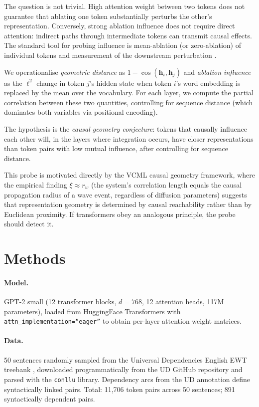 \documentclass[11pt,a4paper]{article}
\begin{document}
The question is not trivial.
High attention weight between two tokens does not guarantee that ablating one
token substantially perturbs the other's representation.
Conversely, strong ablation influence does not require direct attention:
indirect paths through intermediate tokens can transmit causal effects.
The standard tool for probing influence is mean-ablation (or zero-ablation)
of individual tokens and measurement of the downstream perturbation
\cite{vig2020causal,meng2022rome}.

We operationalise \emph{geometric distance} as $1 - \cos(\mathbf{h}_i, \mathbf{h}_j)$
and \emph{ablation influence} as the $\ell^2$ change in token $j$'s
hidden state when token $i$'s word embedding is replaced by the
mean over the vocabulary.
For each layer, we compute the partial correlation between these two
quantities, controlling for sequence distance (which dominates
both variables via positional encoding).

The hypothesis is the \emph{causal geometry conjecture}:
tokens that causally influence each other will, in the layers where
integration occurs, have closer representations than token pairs
with low mutual influence, after controlling for sequence distance.

This probe is motivated directly by the VCML causal geometry framework,
where the empirical finding $\xi \approx r_w$ (the system's correlation
length equals the causal propagation radius of a wave event, regardless
of diffusion parameters) suggests that representation geometry is
determined by causal reachability rather than by Euclidean proximity.
If transformers obey an analogous principle, the probe should detect it.

\section{Methods}

\paragraph{Model.}
GPT-2 small \cite{radford2019gpt2} (12 transformer blocks, $d = 768$, 12 attention
heads, 117M parameters), loaded from HuggingFace Transformers with
\texttt{attn\_implementation=``eager''} to obtain per-layer attention weight matrices.

\paragraph{Data.}
50 sentences randomly sampled from the Universal Dependencies English EWT
treebank \cite{silveira2014gold}, downloaded programmatically from the
UD GitHub repository and parsed with the \texttt{conllu} library.
Dependency arcs from the UD annotation define syntactically linked pairs.
Total: 11{,}706 token pairs across 50 sentences; 891 syntactically dependent pairs.
\end{document}
